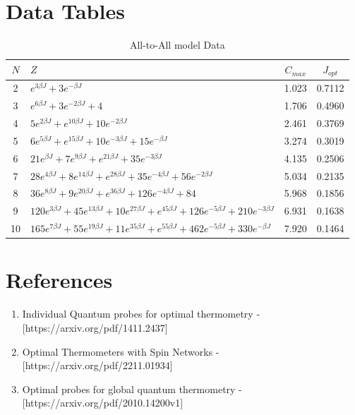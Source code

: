 \documentclass{article}
\begin{document}
\section{Data Tables}
\begin{table}[h]
    \centering
    \caption{All-to-All model Data}
    \begin{tabular}{|c|l|c|c|}
        \hline 
        $N$ & $Z$ & $C_{max}$ & $J_{opt}$ \\
        \hline
        2 & $e^{3 \beta J} + 3 e^{-\beta J}$ & 1.023 & 0.7112 \\
        \hline
        3 & $e^{6 \beta J} +3e^{-2 \beta J} + 4$ & 1.706 & 0.4960 \\
        \hline
        4 & $5 e^{2 \beta J} + e^{10 \beta J} + 10 e^{-2 \beta J}$ & 2.461 & 0.3769 \\
        \hline
        5 & $6 e^{5 \beta J} + e^{15 \beta J} + 10 e^{-3 \beta J} + 15 e^{-\beta J}$ & 3.274 & 0.3019 \\
        \hline
        6 & $21 e^{\beta J} + 7 e^{9\beta J} + e^{21\beta J} + 35 e^{-3\beta J}$ & 4.135 & 0.2506 \\
        \hline
        7 & $28 e^{4\beta J} + 8 e^{14\beta J} + e^{28\beta J} + 35 e^{-4\beta J} + 56 e^{-2\beta J}$ & 5.034 & 0.2135 \\
        \hline
        8 & $36 e^{8 \beta J} + 9 e^{20 \beta J} + e^{36 \beta J}  + 126 e^{-4 \beta J}+ 84$ & 5.968 & 0.1856 \\
        \hline
        9 & $120 e^{3 \beta J} + 45 e^{13 \beta J} + 10 e^{27 \beta J} + e^{45 \beta J} + 126 e^{-5 \beta J} + 210 e^{-3 \beta J}$ & 6.931 & 0.1638 \\
        \hline
        10 & $165 e^{7 \beta J} + 55 e^{19 \beta J} + 11 e^{35 \beta J} + e^{55 \beta J} + 462 e^{-5 \beta J} + 330 e^{-\beta J} $ & 7.920 & 0.1464 \\
        \hline
    \end{tabular}
    \label{All-To-All Data}
\end{table} 


\section{References}
\begin{enumerate}
    \item \label{Paper1}Individual Quantum probes for optimal thermometry - [https://arxiv.org/pdf/1411.2437]
    \item \label{Paper2}Optimal Thermometers with Spin Networks - [https://arxiv.org/pdf/2211.01934]
    \item \label{Paper3}Optimal probes for global quantum thermometry - [https://arxiv.org/pdf/2010.14200v1]
\end{enumerate}   
\end{document}
